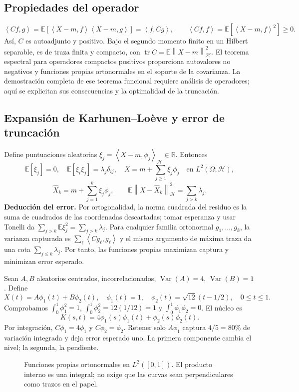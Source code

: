 \documentclass[11pt,a4paper]{article}
\newcommand{\R}{\mathbb R}
\newcommand{\E}{\mathbb E}
\newcommand{\norm}[1]{\left\lVert #1\right\rVert}
\newcommand{\ip}[2]{\left\langle #1,#2\right\rangle}
\DeclareMathOperator{\Var}{Var}
\DeclareMathOperator{\tr}{tr}
\theoremstyle{definition}
\begin{document}
\subsection{Propiedades del operador}
\[
\ip{Cf}g=\E[\ip{X-m}f\ip{X-m}g]=\ip f{Cg},\qquad
\ip{Cf}f=\E[\ip{X-m}f^2]\ge0.
\]
Así, $C$ es autoadjunto y positivo. Bajo el segundo momento finito en un Hilbert separable, es de traza finita y compacto, con $\tr C=\E\norm{X-m}_{\mathcal H}^2$. El teorema espectral para operadores compactos positivos proporciona autovalores no negativos y funciones propias ortonormales en el soporte de la covarianza. La demostración completa de ese teorema funcional requiere análisis de operadores; aquí se explicitan sus consecuencias y la optimalidad de la truncación.
\subsection{Expansión de Karhunen--Loève y error de truncación}
Define puntuaciones aleatorias $\xi_j=\ip{X-m}{\phi_j}_{\mathcal H}\in\R$. Entonces
\[
\E[\xi_j]=0,\quad\E[\xi_i\xi_j]=\lambda_j\delta_{ij},\quad
X=m+\sum_{j\ge1}\xi_j\phi_j\quad\text{en }L^2(\Omega;\mathcal H),
\]
\[
\widehat X_k=m+\sum_{j=1}^k\xi_j\phi_j,\qquad
\boxed{\E\norm{X-\widehat X_k}_{\mathcal H}^2=\sum_{j>k}\lambda_j}.
\]
\textbf{Deducción del error.} Por ortogonalidad, la norma cuadrada del residuo es la suma de cuadrados de las coordenadas descartadas; tomar esperanza y usar Tonelli da $\sum_{j>k}\E\xi_j^2=\sum_{j>k}\lambda_j$. Para cualquier familia ortonormal $g_1,\ldots,g_k$, la varianza capturada es $\sum_\ell\ip{Cg_\ell}{g_\ell}$ y el mismo argumento de máxima traza da una cota $\sum_{j\le k}\lambda_j$. Por tanto, las funciones propias maximizan captura y minimizan error esperado.
\begin{ejemplo}
Sean $A,B$ aleatorios centrados, incorrelacionados, $\Var(A)=4$, $\Var(B)=1$. Define
\[
X(t)=A\phi_1(t)+B\phi_2(t),\quad
\phi_1(t)=1,\quad\phi_2(t)=\sqrt{12}(t-1/2),\quad0\le t\le1.
\]
Comprobamos $\int_0^1\phi_1^2=1$, $\int_0^1\phi_2^2=12(1/12)=1$ y $\int_0^1\phi_1\phi_2=0$. El núcleo es
\[
K(s,t)=4\phi_1(s)\phi_1(t)+\phi_2(s)\phi_2(t).
\]
Por integración, $C\phi_1=4\phi_1$ y $C\phi_2=\phi_2$. Retener solo $A\phi_1$ captura $4/5=80\%$ de variación integrada y deja error esperado uno. La primera componente cambia el nivel; la segunda, la pendiente.
\end{ejemplo}
\begin{figure}[H]\centering
{}
\caption{Funciones propias ortonormales en $L^2([0,1])$. El producto interno es una integral; no exige que las curvas sean perpendiculares como trazos en el papel.}
\end{figure}
\end{document}
